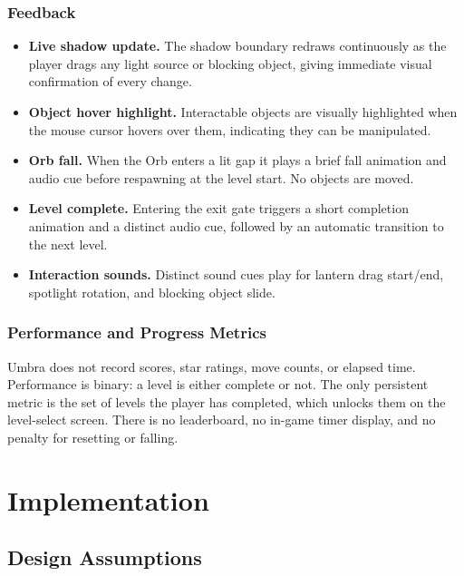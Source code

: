 \documentclass[11pt, letterpaper]{article}
\begin{document}
        \subsubsection{Feedback}
        \begin{itemize}[leftmargin=1.5em, itemsep=2pt]
            \item \textbf{Live shadow update.} The shadow boundary redraws continuously
                  as the player drags any light source or blocking object, giving
                  immediate visual confirmation of every change.
            \item \textbf{Object hover highlight.} Interactable objects are visually
                  highlighted when the mouse cursor hovers over them, indicating they
                  can be manipulated.
            \item \textbf{Orb fall.} When the Orb enters a lit gap it plays a brief
                  fall animation and audio cue before respawning at the level start.
                  No objects are moved.
            \item \textbf{Level complete.} Entering the exit gate triggers a short
                  completion animation and a distinct audio cue, followed by an
                  automatic transition to the next level.
            \item \textbf{Interaction sounds.} Distinct sound cues play for lantern
                  drag start/end, spotlight rotation, and blocking object slide.
        \end{itemize}

        \subsubsection{Performance and Progress Metrics}
        Umbra does not record scores, star ratings, move counts, or elapsed time.
        Performance is binary: a level is either complete or not. The only persistent
        metric is the set of levels the player has completed, which unlocks them on
        the level-select screen. There is no leaderboard, no in-game timer display,
        and no penalty for resetting or falling.

\section{Implementation}

    \subsection{Design Assumptions}
\end{document}
